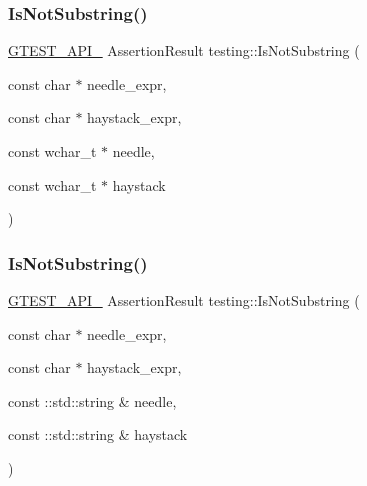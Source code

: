 \subsubsection{\texorpdfstring{Is\+Not\+Substring()}{IsNotSubstring()}\hspace{0.1cm}{\footnotesize\ttfamily [2/3]}}
{\footnotesize\ttfamily \hyperlink{gtest-port_8h_aa73be6f0ba4a7456180a94904ce17790}{G\+T\+E\+S\+T\+\_\+\+A\+P\+I\+\_\+} Assertion\+Result testing\+::\+Is\+Not\+Substring (\begin{DoxyParamCaption}\item[{const char $\ast$}]{needle\+\_\+expr,  }\item[{const char $\ast$}]{haystack\+\_\+expr,  }\item[{const wchar\+\_\+t $\ast$}]{needle,  }\item[{const wchar\+\_\+t $\ast$}]{haystack }\end{DoxyParamCaption})}

\mbox{\label{namespacetesting_a645d822e47dc64b9923e78c880807f12}} 
\subsubsection{\texorpdfstring{Is\+Not\+Substring()}{IsNotSubstring()}\hspace{0.1cm}{\footnotesize\ttfamily [3/3]}}
{\footnotesize\ttfamily \hyperlink{gtest-port_8h_aa73be6f0ba4a7456180a94904ce17790}{G\+T\+E\+S\+T\+\_\+\+A\+P\+I\+\_\+} Assertion\+Result testing\+::\+Is\+Not\+Substring (\begin{DoxyParamCaption}\item[{const char $\ast$}]{needle\+\_\+expr,  }\item[{const char $\ast$}]{haystack\+\_\+expr,  }\item[{const \+::std\+::string \&}]{needle,  }\item[{const \+::std\+::string \&}]{haystack }\end{DoxyParamCaption})}

\mbox{\label{namespacetesting_a5c90a86562b2470213c07742e0eeb0fe}} 
